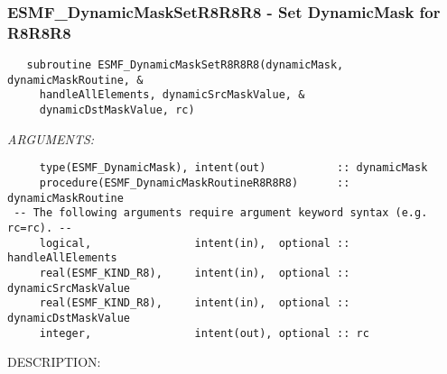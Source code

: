  
\setlength{\oldparskip}{\parskip}
\setlength{\parskip}{1.5ex}
\setlength{\oldparindent}{\parindent}
\setlength{\parindent}{0pt}
\setlength{\oldbaselineskip}{\baselineskip}
\setlength{\baselineskip}{11pt}
 
\def\bv{\begin{verbatim}}
\def\ev{\end{verbatim}}
\def\be{\begin{equation}}
\def\ee{\end{equation}}
\def\bea{\begin{eqnarray}}
\def\eea{\end{eqnarray}}
\def\bi{\begin{itemize}}
\def\ei{\end{itemize}}
\def\bn{\begin{enumerate}}
\def\en{\end{enumerate}}
\def\bd{\begin{description}}
\def\ed{\end{description}}
\def\({\left (}
\def\){\right )}
\def\[{\left [}
\def\]{\right ]}
\def\<{\left  \langle}
\def\>{\right \rangle}
\def\cI{{\cal I}}
\def\diag{\mathop{\rm diag}}
\def\tr{\mathop{\rm tr}}


 
\subsubsection [ESMF\_DynamicMaskSetR8R8R8] {ESMF\_DynamicMaskSetR8R8R8 - Set DynamicMask for R8R8R8}


\begin{verbatim}   subroutine ESMF_DynamicMaskSetR8R8R8(dynamicMask, dynamicMaskRoutine, &
     handleAllElements, dynamicSrcMaskValue, &
     dynamicDstMaskValue, rc)\end{verbatim}{\em ARGUMENTS:}
\begin{verbatim}     type(ESMF_DynamicMask), intent(out)           :: dynamicMask
     procedure(ESMF_DynamicMaskRoutineR8R8R8)      :: dynamicMaskRoutine
 -- The following arguments require argument keyword syntax (e.g. rc=rc). --
     logical,                intent(in),  optional :: handleAllElements
     real(ESMF_KIND_R8),     intent(in),  optional :: dynamicSrcMaskValue
     real(ESMF_KIND_R8),     intent(in),  optional :: dynamicDstMaskValue
     integer,                intent(out), optional :: rc
           \end{verbatim}
{\sf DESCRIPTION:\\ }


